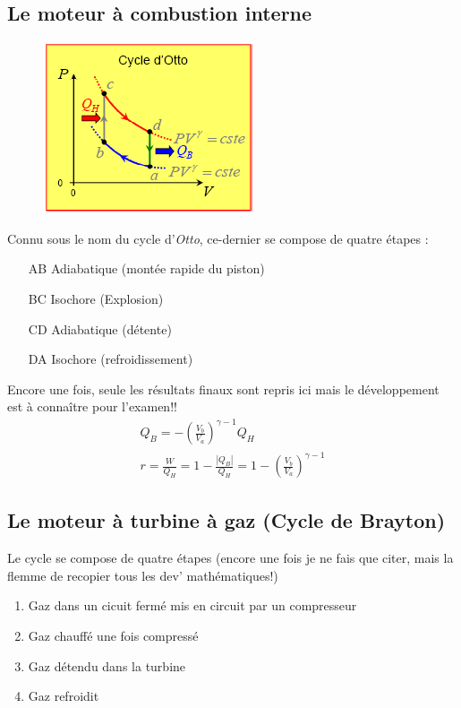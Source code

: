 \documentclass	[11pt, a4paper, openany]{book}
\begin{document}
\subsection{Le moteur à combustion interne}
\begin{figure}
	\includegraphics[scale=0.54]{th/image18.png}
\end{figure}
Connu sous le nom du cycle d'\textit{Otto}, ce-dernier se compose de quatre étapes :
\begin{itemize}
	\item[AB] Adiabatique (montée rapide du piston)
	\item[BC] Isochore (Explosion)
	\item[CD] Adiabatique (détente)
	\item[DA] Isochore (refroidissement)
\end{itemize}
Encore une fois, seule les résultats finaux sont repris ici mais le développement est à connaître pour l'examen!!
\begin{eqnarray}
	Q_B = -\left(\frac{V_b}{V_a}\right)^{\gamma -1}Q_H\\
	r = \frac{W}{Q_H} = 1 - \frac{|Q_B|}{Q_H} = 1 - \left(\frac{V_b}{V_a}\right)^{\gamma -1}
\end{eqnarray}


\subsection{Le moteur à turbine à gaz (Cycle de Brayton)}
Le cycle se compose de quatre étapes (encore une fois je ne fais que citer, mais la flemme de recopier tous les dev' mathématiques!)
\begin{enumerate}
	\item Gaz dans un cicuit fermé mis en circuit par un compresseur 
	\item Gaz chauffé une fois compressé
	\item Gaz détendu dans la turbine
	\item Gaz refroidit
\end{enumerate}
\end{document}

